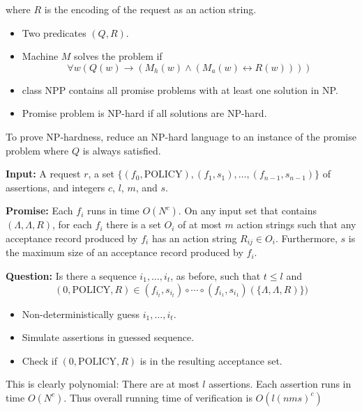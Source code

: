 \documentclass[landscape]{slides}
\begin{document}
where $R$ is the encoding of the request as an action string.
\stopslide

\begin{itemize}
\item Two predicates $(Q, R)$. 
\item Machine $M$ solves the problem if
\begin{displaymath}
\forall w (Q(w) \rightarrow (M_h(w) \wedge (M_a(w) \leftrightarrow R(w))))
\end{displaymath}
\item class NPP contains all promise problems with at least one solution in NP.
\item Promise problem is NP-hard if all solutions are NP-hard.
\end{itemize}
To prove NP-hardness, reduce an NP-hard language to an instance of the promise problem where $Q$ is always satisfied.
\stopslide

\textbf{Input:} A request $r$, a set $\{(f_0, \mbox{POLICY}), (f_1, s_1), \ldots, (f_{n-1}, s_{n-1})\}$ of assertions, and integers $c$, $l$, $m$, and $s$.

\textbf{Promise:} Each $f_i$ runs in time $O(N^c)$. On any input set that contains $(\Lambda, \Lambda, R)$, for each $f_i$ there is a set $O_i$ of at most $m$ action strings such that any acceptance record produced by $f_i$ has an action string $R_{ij} \in O_i$. Furthermore, $s$ is the maximum size of an acceptance record produced by $f_i$.

\textbf{Question:} Is there a sequence $i_1, \ldots, i_t$, as before, such that $t \le l$ and
\begin{displaymath}
  (0, \mbox{POLICY}, R) \in (f_{i_t}, s_{i_t}) \circ \cdots \circ (f_{i_1}, s_{i_1})(\{\Lambda, \Lambda, R)\})
\end{displaymath}

\stopslide


\begin{itemize}
\item Non-deterministically guess $i_1, \ldots, i_t$.
\item Simulate assertions in guessed sequence.
\item Check if $(0, \mbox{POLICY}, R)$ is in the resulting acceptance set.
\end{itemize}

This is clearly polynomial: There are at most $l$ assertions. Each assertion runs in time $O(N^c)$. Thus overall running time of verification is $O(l(nms)^c)$
\end{document}
